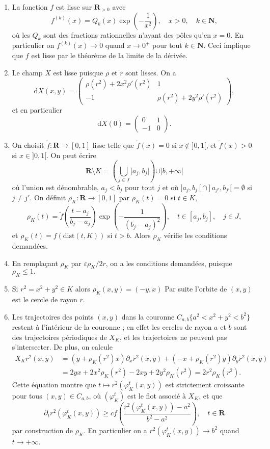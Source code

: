 \documentclass[a4paper,12pt,openany]{article}
\theoremstyle{plain}
\theoremstyle{definition}
\newcommand{\dd}{\mathrm{d}}
\newcommand{\R}{\mathbf{R}}
\newcommand{\N}{\mathbf{N}}
\begin{document}
\begin{enumerate}
\item La fonction $f$ est lisse sur $\R_{>0}$ avec
$$
f^{(k)}(x) = Q_k(x) \exp\left(-\frac{1}{x^2}\right), \quad x > 0, \quad k \in \N,
$$
o\`u les $Q_k$ sont des fractions rationnelles n'ayant des p\^oles qu'en $x = 0$. En particulier on $f^{(k)}(x) \to 0$ quand $x \to 0^+$ pour tout $k \in \N$. Ceci implique que $f$ est lisse par le th\'eor\`eme de la limite de la d\'eriv\'ee.
\item Le champ $X$ est lisse puisque $\rho$ et $r$ sont lisses. On a 
$$
\dd X(x,y) = \begin{pmatrix} \rho(r^2) + 2x^2 \rho'(r^2) & 1 \\ -1 & \rho(r^2) + 2y^2\rho'(r^2)\end{pmatrix},
$$
et en particulier
$$
\dd X(0) = \begin{pmatrix} 0 & 1 \\ -1 & 0 \end{pmatrix}.
$$
\item On choisit $\tilde f : \R \to [0,1]$ lisse telle que $\tilde f(x) = 0$ si $x \notin ]0,1[$, et $\tilde f(x) > 0$ si $x \in ]0,1[.$ On peut \'ecrire 
$$\R \setminus K = \left(\bigcup_{j \in J} ]a_j, b_j[ \right) \cup ]b, +\infty[$$
o\`u l'union est d\'enombrable, $a_j < b_j$ pour tout $j$ et o\`u $]a_j, b_j[ \cap ]a_{j'}, b_{j'}[ = \emptyset$ si $j \neq j'$. On d\'efinit $\rho_K : \R \to [0,1]$ par $\rho_K(t) = 0$ si $t \in K$,
$$
\rho_K(t) = \tilde f\left( \frac{t-a_j}{b_j - a_j} \right) \exp \left(-\frac{1}{(b_j - a_j)^2}\right), \quad t \in [a_j, b_j], \quad j \in J,
$$
et $\rho_K(t) = f(\mathrm{dist}(t, K))$ si $t > b$.
Alors $\rho_K$ v\'erifie les conditions demand\'ees.
\item En rempla\c cant $\rho_K$ par $\varepsilon \rho_K /2r$, on a les conditions demand\'ees, puisque $\rho_K \leq 1.$
\item Si $r^2 = x^2 + y^2 \in K$ alors $\rho_K(x,y) = (-y,x)$ Par suite l'orbite de $(x,y)$ est le cercle de rayon $r$.
\item Les trajectoires des points $(x,y)$ dans la couronne $C_{a,b}\{a^2< x^2 + y^2 < b^2\}$ restent \`a l'int\'erieur de la couronne ; en effet les cercles de rayon $a$ et $b$ sont des trajectoires p\'eriodiques de $X_K$, et les trajectoires ne peuvent pas s'intersecter. De plus, on calcule
$$
\begin{aligned}
X_K r^2(x,y) &= (y + \rho_K(r^2)x)\partial_x r^2(x,y) + (-x + \rho_K(r^2)y) \partial_y r^2(x,y) \\
&= 2yx + 2x^2\rho_K(r^2) -2xy + 2y^2 \rho_K(r^2) = 2r^2 \rho_K(r^2).
\end{aligned}
$$
Cette \'equation montre que $t \mapsto r^2(\varphi_K^t(x,y))$ est strictement croissante pour tous $(x,y) \in C_{a,b}$, o\`u $(\varphi_K^t)$ est le flot associ\'e \`a $X_K$, et que 
$$
\partial_t r^2(\varphi_K^t(x,y)) \geq c \tilde f\left(\frac{r^2(\varphi_K^t(x,y)) - a^2}{b^2-a^2}\right), \quad t \in \R
$$
par construction de $\rho_K$. En particulier on a $r^2(\varphi_K^t(x,y)) \to b^2$ quand $t \to +\infty$.


\end{enumerate}
\end{document}
